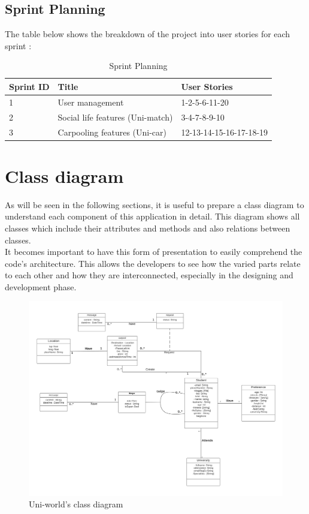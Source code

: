 \subsection{Sprint Planning}
The table below shows the breakdown of the project into user stories for each sprint :
\begin{table}[H]
    \centering
    \begin{tabular}{|p{2cm}|p{6cm}|p{4cm}|}
        \hline
Sprint ID & Title & User Stories \\
\hline
1 & User management & 1-2-5-6-11-20 \\
\hline
2 & Social life features (Uni-match) & 3-4-7-8-9-10 \\
\hline
3 & Carpooling features (Uni-car) & 12-13-14-15-16-17-18-19 \\
\hline
    \end{tabular}
    \caption{Sprint Planning}
    \label{Tab: Sprint Planning}
\end{table}
\section{Class diagram}
As will be seen in the following sections, it is useful to prepare a class diagram to understand each component of this application in detail. This diagram shows all classes which include their attributes and methods and also relations between classes. \\
It becomes important to have this form of presentation to easily comprehend the code’s architecture. This allows the developers to see how the varied parts relate to each other and how they are interconnected, especially in the designing and development phase.

\begin{figure}[H] 
            \centering
            \includegraphics[scale=0.3]{diagrams/class diagram.png}
            \caption{Uni-world's class diagram } 
            \label{fig: Uniworld's class diagram}
\end{figure}

